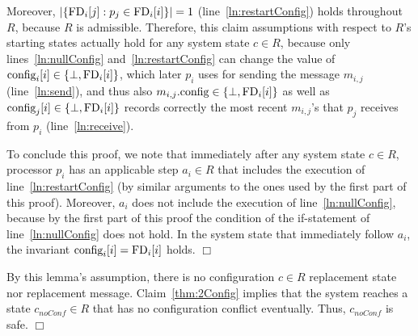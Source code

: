 \documentclass[11pt]{article}
\newenvironment{proof}{\noindent{\bf Proof.}}{\hfill$\Box$}
\begin{document}
\begin{proof}
\begin{proof}
 Moreover, $|\{  \textnormal{FD}
_i[j]: p_j \in \textnormal{FD}_i[i] \}|=1$ (line~\ref{ln:restartConfig}) holds throughout $R$, because $R$ is admissible. Therefore, this claim assumptions with respect to $R$'s starting states actually hold for any system state $c \in R$, because only lines~\ref{ln:nullConfig} and~\ref{ln:restartConfig} can change the value of $\textnormal{config}_i[i] \in \{ \bot, \textnormal{FD}_i[i] \}$, which later $p_i$ uses for sending the message $m_{i,j}$ (line~\ref{ln:send}), and thus also $m_{i,j}.\textnormal{config}  \in \{ \bot, \textnormal{FD}_i[i] \}$ as well as $\textnormal{config}_j[i] \in \{ \bot, \textnormal{FD}_i[i] \}$ records correctly the most recent $m_{i,j}$'s that $p_j$ receives from $p_i$ (line~\ref{ln:receive}).    

To conclude this proof, we note that immediately after any system state $c \in R$, processor $p_i$ has an applicable step $a_i \in R$ that includes the execution of line~\ref{ln:restartConfig} (by similar arguments to the ones used by the first part of this proof). Moreover, $a_i$ does not include the execution of line~\ref{ln:nullConfig}, because by the first part of this proof the condition of the if-statement of line~\ref{ln:nullConfig} does not hold. In the system state that immediately follow $a_i$, the invariant $\textnormal{config}_i[i] = \textnormal{FD}_i[i]$ holds. 
\end{proof}



By this lemma's assumption, there is no configuration $c \in R$ replacement state nor replacement message. Claim~\ref{thm:2Config} implies that the system reaches a state $c_{noConf} \in R$ that has no configuration conflict eventually. Thus, $c_{noConf}$ is safe.   
\end{proof}
\end{document}
